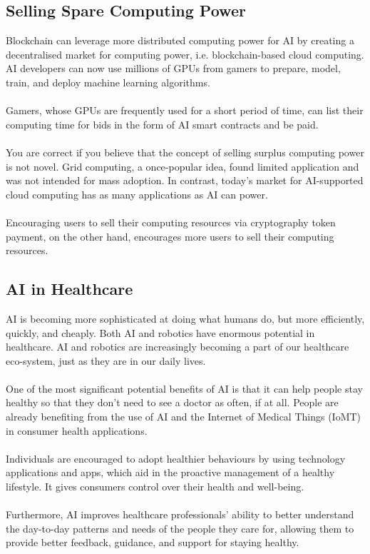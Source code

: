 \documentclass[12pt,letterpaper]{article}
\begin{document}
\pagebreak


    \subsection* {Selling Spare Computing Power}
    Blockchain can leverage more distributed computing power for AI by creating a decentralised market for computing power, i.e. blockchain-based cloud computing. AI developers can now use millions of GPUs from gamers to prepare, model, train, and deploy machine learning algorithms.
    \\
    \\
    Gamers, whose GPUs are frequently used for a short period of time, can list their computing time for bids in the form of AI smart contracts and be paid.
    \\
    \\
    You are correct if you believe that the concept of selling surplus computing power is not novel. Grid computing, a once-popular idea, found limited application and was not intended for mass adoption. In contrast, today's market for AI-supported cloud computing has as many applications as AI can power. 
    \\
    \\
    Encouraging users to sell their computing resources via cryptography token payment, on the other hand, encourages more users to sell their computing resources.

\pagebreak

\subsection* {AI in Healthcare}
    AI is becoming more sophisticated at doing what humans do, but more efficiently, quickly, and cheaply. Both AI and robotics have enormous potential in healthcare. AI and robotics are increasingly becoming a part of our healthcare eco-system, just as they are in our daily lives.
\\
\\
One of the most significant potential benefits of AI is that it can help people stay healthy so that they don't need to see a doctor as often, if at all. People are already benefiting from the use of AI and the Internet of Medical Things (IoMT) in consumer health applications.
\\
\\
Individuals are encouraged to adopt healthier behaviours by using technology applications and apps, which aid in the proactive management of a healthy lifestyle. It gives consumers control over their health and well-being.
\\
\\
Furthermore, AI improves healthcare professionals' ability to better understand the day-to-day patterns and needs of the people they care for, allowing them to provide better feedback, guidance, and support for staying healthy.


    
  
\end{document}
